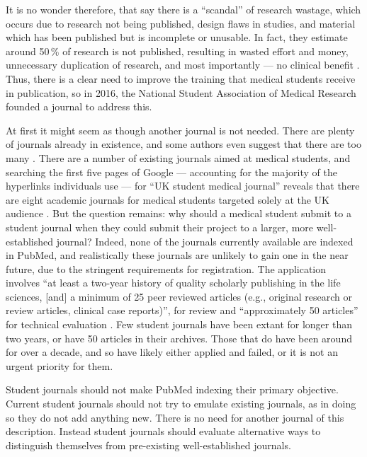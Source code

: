 It is no wonder therefore, that \cite{Glasziou2018} say there is a ``scandal'' of research wastage, which occurs due to research not being published, design flaws in studies, and material which has been published but is incomplete or unusable. In fact, they estimate around 50\,\% of research is not published, resulting in wasted effort and money, unnecessary duplication of research, and most importantly --- no clinical benefit \citep{Glasziou2016}. Thus, there is a clear need to improve the training that medical students receive in publication, so in 2016, the National Student Association of Medical Research founded a journal to address this.

At first it might seem as though another journal is not needed. There are plenty of journals already in existence, and some authors even suggest that there are too many \citep{Oosterhaven2015}. There are a number of existing journals aimed at medical students, and searching the first five pages of Google --- accounting for the majority of the hyperlinks individuals use \citep{Chaffey2018} --- for ``UK student medical journal'' reveals that there are eight academic journals for medical students targeted solely at the UK audience \citep{BritishMedicalJournal2018,CambridgeMedicalJournal2018,INSPIRE2018,JournaloftheRoyalMedicalSociety2018,ManchesterMedicalJournal2018,TheBritishStudentDoctorJournal2018}. But the question remains: why should a medical student submit to a student journal when they could submit their project to a larger, more well-established journal? Indeed, none of the journals currently available are indexed in PubMed, and realistically these journals are unlikely to gain one in the near future, due to the stringent requirements for registration. The application involves ``at least a two-year history of quality scholarly publishing in the life sciences, [and] a minimum of 25 peer reviewed articles (e.g., original research or review articles, clinical case reports)'', for review and ``approximately 50 articles'' for technical evaluation \citep{PMCUSNationalLibraryofMedicineNationalInstitutesofHealth2018}. Few student journals have been extant for longer than two years, or have 50 articles in their archives. Those that do have been around for over a decade, and so have likely either applied and failed, or it is not an urgent priority for them.

Student journals should not make PubMed indexing their primary objective. Current student journals should not try to emulate existing journals, as in doing so they do not add anything new. There is no need for another journal of this description. Instead student journals should evaluate alternative ways to distinguish themselves from pre-existing well-established journals.

